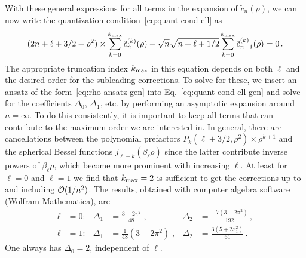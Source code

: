   With these general expressions for all terms in the expansion of
  $\tilde{c}_n(\rho)$, we can now write the quantization
  condition~\eqref{eq:quant-cond-ell} as
  \begin{equation}
   (2n+\ell+3/2-\rho^2)\times\sum_{k=0}^{{k_{\mathrm{max}}}} \tilde{c}_n^{(k)}(\rho)
    - \sqrt{n}\sqrt{n+\ell+1/2}
   \sum_{k=0}^{{k_{\mathrm{max}}}}\tilde{c}_{n-1}^{(k)}(\rho) = 0 \,.
  \label{eq:quant-cond-ell-gen}
\end{equation}
  The appropriate truncation index ${k_{\mathrm{max}}}$ in this equation depends on both
  $\ell$ and the desired order for the subleading corrections.  To solve for
  these, we insert an ansatz of the form~\eqref{eq:rho-ansatz-gen} into
  Eq.~\eqref{eq:quant-cond-ell-gen} and solve for the coefficients $\Delta_0$,
  $\Delta_1$, etc. by performing an asymptotic expansion around $n=\infty$.  To
  do this consistently, it is important to keep all terms that can
  contribute to the
  maximum order we are interested in.  In general, there are cancellations
  between the polynomial prefactors $P_k(\ell+3/2,\rho^2)\times\rho^{k+1}$ and
  the spherical Bessel functions $j_{\ell+k}(\beta_\ell\rho)$ since the latter
  contribute inverse powers of $\beta_\ell\rho$, which become more prominent
  with increasing $\ell$.  At least for $\ell=0$ and $\ell=1$ we find
  that ${k_{\mathrm{max}}}=2$
  is sufficient to get the corrections up to and including $\mathcal{O}(1/n^2)$.  The
  results, obtained with computer algebra software (Wolfram Mathematica), are
  \begin{align}
   \ell &= 0:  & \Delta_1 &= \frac{3-2\pi^2}{48} \;,
   & \Delta_2 &= \frac{-7(3-2\pi^2)}{192} \,, \\
   \ell &= 1:  & \Delta_1 &= \frac{1}{48}(3-2\pi^2) \;,
   & \Delta_2 &= \frac{3(5+2x_1^2)}{64} \,.
   \label{eq:lasteq}
  \end{align}
  One always has $\Delta_0=2$, independent of $\ell$.

